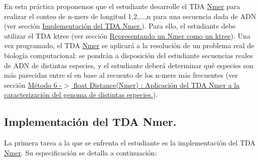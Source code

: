 En esta práctica proponemos que el estudiante desarrolle el T\+DA \hyperlink{classNmer}{Nmer} para realizar el conteo de n-\/mers de longitud 1,2,...,n para una secuencia dada de A\+DN (ver sección \hyperlink{index_Nmer}{Implementación del T\+DA Nmer.}). Para ello, el estudiante debe utilizar el T\+DA ktree (ver sección \hyperlink{index_ktreegen}{Representando un Nmer como un ktree}). Una vez programado, el T\+DA \hyperlink{classNmer}{Nmer} se aplicará a la resolución de un problema real de biología computacional\+: se pondrán a disposición del estudiante secuencias reales de A\+DN de distintas especies, y el estudiante deberá determinar qué especies son más parecidas entre sí en base al recuento de los n-\/mers más frecuentes (ver sección \hyperlink{index_problemaBiologia}{Método 6 -\/$>$ float Distance(\+Nmer) \+: Aplicación del T\+DA Nmer a la caracterización del genoma de distintas especies.}).\hypertarget{index_Nmer}{}\subsection{Implementación del T\+D\+A Nmer.}\label{index_Nmer}
La primera tarea a la que se enfrenta el estudiante es la implementación del T\+DA \hyperlink{classNmer}{Nmer}. Su especificación se detalla a continuación\+:


